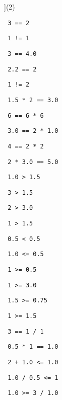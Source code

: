 \begin{exercise}

\begin{sltasks}[counter-format=2.tsk[1]](2)
  \task
  \begin{items}
    \item \texttt{ 3 == 2 }
    \item \texttt{ 1 != 1 }
    \item \texttt{ 3 == 4.0 }
    \item \texttt{ 2.2 == 2 }
    \item \texttt{ 1 != 2 }
  \end{items}
  \task
  \begin{items}
    \item \texttt{ 1.5 * 2 == 3.0 }
    \item \texttt{ 6 == 6 * 6 }
    \item \texttt{ 3.0 == 2 * 1.0 }
    \item \texttt{ 4 == 2 * 2 }
    \item \texttt{ 2 * 3.0 == 5.0 }
  \end{items}
  \task
  \begin{items}
    \item \texttt{ 1.0 > 1.5 }
    \item \texttt{ 3 > 1.5 }
    \item \texttt{ 2 > 3.0 }
    \item \texttt{ 1 > 1.5 }
    \item \texttt{ 0.5 < 0.5 }
  \end{items}
  \task
  \begin{items}
    \item \texttt{ 1.0 <= 0.5 }
    \item \texttt{ 1 >= 0.5 }
    \item \texttt{ 1 >= 3.0 }
    \item \texttt{ 1.5 >= 0.75 }
    \item \texttt{ 1 >= 1.5 }
  \end{items}
  \task
  \begin{items}
    \item \texttt{ 3 == 1 / 1 }
    \item \texttt{ 0.5 * 1 == 1.0 }
    \item \texttt{ 2 + 1.0 <= 1.0 }
    \item \texttt{ 1.0 / 0.5 <= 1 }
    \item \texttt{ 1.0 >= 3 / 1.0 }
  \end{items}
  \task

\end{sltasks}
\end{exercise}
